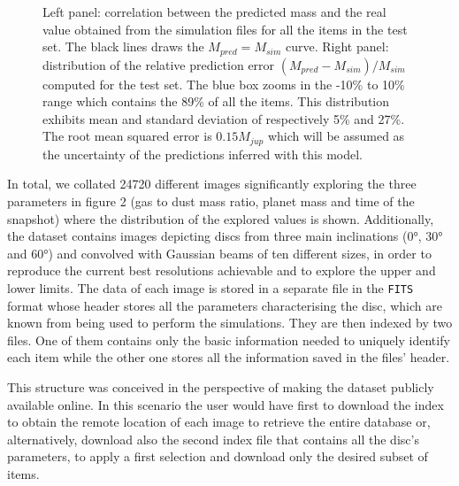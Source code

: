 \documentclass[a4paper,10pt, margin=1cm]{article}
\begin{document}
\begin{figure}
  \begin{center}
    \scalebox{0.85}{}
  \end{center}

  \caption{Left panel: correlation between the predicted mass and the real value obtained from the simulation files
    for all the items in the test set. The black lines draws the $M_{pred} = M_{sim}$ curve.
    Right panel: distribution of the relative prediction error $(M_{pred} - M_{sim})/M_{sim}$ 
        computed for the test set. The blue box 
    zooms in the -10\% to 10\% range which contains the 89\% of all the items. This distribution exhibits mean and standard 
    deviation of respectively 5\% and 27\%. The root mean squared error is $0.15 M_{jup}$ which will be assumed
    as the uncertainty of the predictions inferred with this model.}

\end{figure}

In total, we collated 24720 different images significantly exploring the three parameters in figure 2 (gas to dust mass ratio, planet mass and
time of the snapshot) where the distribution of the explored values is shown. Additionally, the dataset contains images depicting discs from three main inclinations (0°, 30° and 60°) and convolved 
with Gaussian beams of ten different sizes, in order to reproduce the current best resolutions achievable and to explore the upper and lower limits.
The data of each image is stored in a separate file in the \lstinline{FITS} format whose header stores all the parameters
characterising the disc, which are known from being used to perform the simulations.
They are then indexed by two files. One of them contains only the basic information
needed to uniquely identify each item while the other one stores all the information saved in the files' header.

This structure was conceived in the perspective of making the dataset publicly available online.
In this scenario the user would have first to download the index to obtain the remote location
of each image to retrieve the entire database or, alternatively, download also the second index file
that contains all the disc's parameters, to apply a first selection and download only the desired subset of items.
\end{document}
